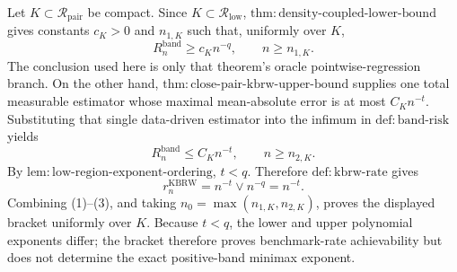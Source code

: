Let \(K\subset\mathcal R_{\mathrm{pair}}\) be compact.  Since \(K\subset\mathcal R_{\mathrm{low}}\), \(\mathrm{thm:density\mbox{-}coupled\mbox{-}lower\mbox{-}bound}\) gives constants \(c_K>0\) and \(n_{1,K}\) such that, uniformly over \(K\),
\[
R_n^{\mathrm{band}}\geq c_Kn^{-q},
\qquad n\geq n_{1,K}.
\tag{1}
\]
The conclusion used here is only that theorem's oracle pointwise-regression branch.  On the other hand, \(\mathrm{thm:close\mbox{-}pair\mbox{-}kbrw\mbox{-}upper\mbox{-}bound}\) supplies one total measurable estimator whose maximal mean-absolute error is at most \(C_Kn^{-t}\).  Substituting that single data-driven estimator into the infimum in \(\mathrm{def:band\mbox{-}risk}\) yields
\[
R_n^{\mathrm{band}}\leq C_Kn^{-t},
\qquad n\geq n_{2,K}.
\tag{2}
\]
By \(\mathrm{lem:low\mbox{-}region\mbox{-}exponent\mbox{-}ordering}\), \(t<q\).  Therefore \(\mathrm{def:kbrw\mbox{-}rate}\) gives
\[
r_n^{\mathrm{KBRW}}=n^{-t}\vee n^{-q}=n^{-t}.
\tag{3}
\]
Combining (1)--(3), and taking \(n_0=\max(n_{1,K},n_{2,K})\), proves the displayed bracket uniformly over \(K\).  Because \(t<q\), the lower and upper polynomial exponents differ; the bracket therefore proves benchmark-rate achievability but does not determine the exact positive-band minimax exponent.